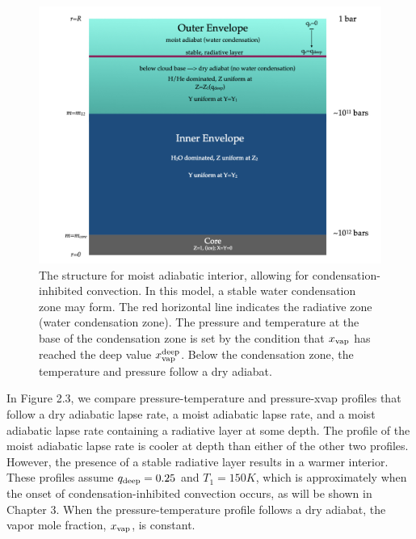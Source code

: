 \documentclass[11pt]{ucscthesisbs}
\begin{document}
\begin{figure}[ht!]
 \centerline{
  \includegraphics[width=6.0in]{figures/structure_schematic/structure_schematic.002.jpeg}
 }
\caption[Interior Structure for Moist Adiabat]
{The structure for moist adiabatic interior, allowing for condensation-inhibited convection. In this model, a stable water condensation zone may form. The red horizontal line indicates the radiative zone (water condensation zone). The pressure and temperature at the base of the condensation zone is set by the condition that $x_{\rm vap}$ has reached the deep value $x_{\rm vap}^{\rm deep}$. Below the condensation zone, the temperature and pressure follow a dry adiabat.}
\label{fig:moist_interior}
\end{figure}

In Figure 2.3, we compare pressure-temperature and pressure-xvap profiles that follow a dry adiabatic lapse rate, a moist adiabatic lapse rate, and a moist adiabatic lapse rate containing a radiative layer at some depth. The profile of the moist adiabatic lapse rate is cooler at depth than either of the other two profiles. However, the presence of a stable radiative layer results in a warmer interior. These profiles assume $q_{\rm deep} = 0.25$ and $T_{1} = 150K$, which is approximately when the onset of condensation-inhibited convection occurs, as will be shown in Chapter 3. When the pressure-temperature profile follows a dry adiabat, the vapor mole fraction, $x_{\rm vap}$, is constant.
\end{document}
